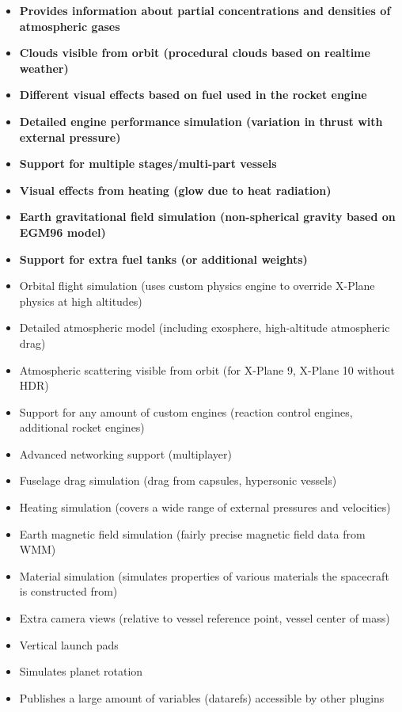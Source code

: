 \documentclass{article}
\begin{document}
\begin{itemize}
  \item \textbf{Provides information about partial concentrations and densities of atmospheric gases}
  \item \textbf{Clouds visible from orbit (procedural clouds based on realtime weather)}
  \item \textbf{Different visual effects based on fuel used in the rocket engine}
  \item \textbf{Detailed engine performance simulation (variation in thrust with external pressure)}
  \item \textbf{Support for multiple stages/multi-part vessels}
  \item \textbf{Visual effects from heating (glow due to heat radiation)}
  \item \textbf{Earth gravitational field simulation (non-spherical gravity based on EGM96 model)}
  \item \textbf{Support for extra fuel tanks (or additional weights)}
  \item Orbital flight simulation (uses custom physics engine to override X-Plane physics at high altitudes)
  \item Detailed atmospheric model (including exosphere, high-altitude atmospheric drag)
  \item Atmospheric scattering visible from orbit (for X-Plane 9, X-Plane 10 without HDR)
  \item Support for any amount of custom engines (reaction control engines, additional rocket engines)
  \item Advanced networking support (multiplayer)
  \item Fuselage drag simulation (drag from capsules, hypersonic vessels)
  \item Heating simulation (covers a wide range of external pressures and velocities)
  \item Earth magnetic field simulation (fairly precise magnetic field data from WMM)
  \item Material simulation (simulates properties of various materials the spacecraft is constructed from)
  \item Extra camera views (relative to vessel reference point, vessel center of mass)
  \item Vertical launch pads
  \item Simulates planet rotation
  \item Publishes a large amount of variables (datarefs) accessible by other plugins
\end{itemize}
\end{document}
